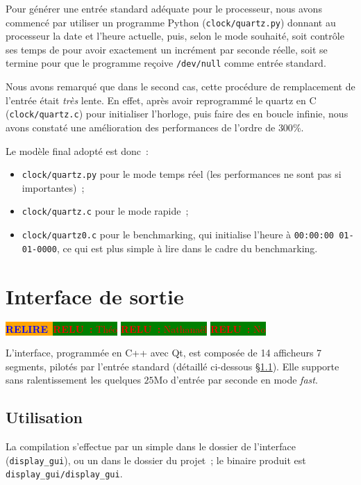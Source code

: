 \documentclass[11pt,a4paper]{article}
\newcommand{\relire}{\colorbox{orange}{\textcolor{blue}{\textbf{RELIRE}~}}}
\newcommand{\relu}[1]{\colorbox{green}{\textcolor{red}{\textbf{RELU~:} #1}}}
\begin{document}
Pour générer une entrée standard adéquate pour le processeur, nous avons commencé par utiliser un programme Python (\texttt{clock/quartz.py}) donnant au processeur la date et l'heure actuelle, puis, selon le mode souhaité, soit contrôle ses temps de  pour avoir exactement un incrément par seconde réelle, soit se termine pour que le programme reçoive \texttt{/dev/null} comme entrée standard.

Nous avons remarqué que dans le second cas, cette procédure de remplacement de l'entrée était \emph{très} lente. En effet, après avoir reprogrammé le quartz en C (\texttt{clock/quartz.c}) pour initialiser l'horloge, puis faire des  en boucle infinie, nous avons constaté une amélioration des performances de l'ordre de $300\%$.

Le modèle final adopté est donc~:
\begin{itemize}
\item \texttt{clock/quartz.py} pour le mode temps réel (les performances ne sont pas si importantes)~;
\item \texttt{clock/quartz.c} pour le mode rapide~;
\item \texttt{clock/quartz0.c} pour le benchmarking, qui initialise l'heure à \verb!00:00:00 01-01-0000!, ce qui est plus simple à lire dans le cadre du benchmarking.
\end{itemize}

\section{Interface de sortie} \label{sec:gui}

\relire \relu{Théo}
\relu{Nathanaël} \relu{No}

L'interface, programmée en C++ avec Qt, est composée de 14 afficheurs 7 segments, pilotés par l'entrée standard (détaillé ci-dessous §\ref{ssec:gui_use}). Elle supporte sans ralentissement les quelques $25\text{Mo}$ d'entrée par seconde en mode \emph{fast}.

\subsection{Utilisation} \label{ssec:gui_use}

La compilation s'effectue par un simple  dans le dossier de l'interface (\texttt{display\_gui}), ou un  dans le dossier du projet~; le binaire produit est \texttt{display\_gui/display\_gui}.
\end{document}

